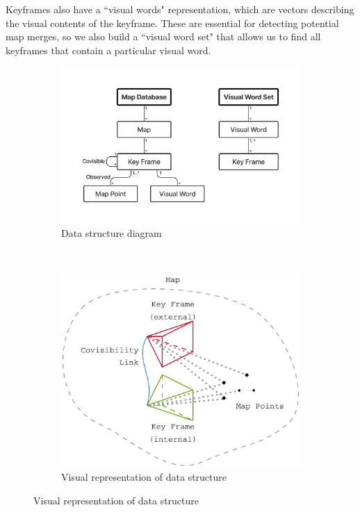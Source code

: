 Keyframes also have a ``visual words" representation, which are vectors describing the visual contents of the keyframe. These are essential for detecting potential map merges, so we also build a ``visual word set" that allows us to find all keyframes that contain a particular visual word.


\begin{figure}[h]
    \centering
    \begin{subfigure}[b]{0.475\textwidth}
        \centering
        \includegraphics[trim=5cm 4cm 5cm 5cm, width=\textwidth]{figures/datastructure_diagram.pdf}
        \caption{Data structure diagram}
        \label{fig:datastructure-diagram}
    \end{subfigure}\hfill%
    ~
    \begin{subfigure}[b]{0.425\textwidth}
        \centering
        \includegraphics[width=\textwidth]{figures/datastructure_viz.pdf}
        \caption{Visual representation of data structure}
        \label{fig:datastructure-viz}
    \end{subfigure}%
\end{figure}

